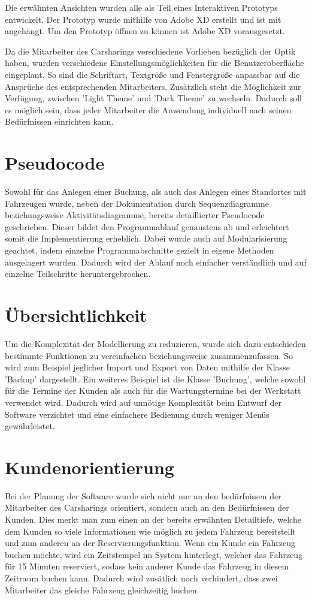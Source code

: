 Die erwähnten Ansichten wurden alle als Teil eines Interaktiven Prototyps entwickelt. Der Prototyp wurde mithilfe von Adobe XD erstellt und ist mit angehängt. Um den Prototyp öffnen zu können ist Adobe XD vorausgesetzt.

Da die Mitarbeiter des Carsharings verschiedene Vorlieben bezüglich der Optik haben, wurden verschiedene Einstellungsmöglichkeiten für die Benutzeroberfläche eingeplant. So sind die Schriftart, Textgröße und Fenstergröße anpassbar auf die Ansprüche des entsprechenden Mitarbeiters. Zusätzlich steht die Möglichkeit zur Verfügung, zwischen 'Light Theme' und 'Dark Theme' zu wechseln. Dadurch soll es möglich sein, dass jeder Mitarbeiter die Anwendung individuell nach seinen Bedürfnissen einrichten kann.

\section{Pseudocode}
Sowohl für das Anlegen einer Buchung, als auch das Anlegen eines Standortes mit Fahrzeugen wurde, neben der Dokumentation durch Sequenzdiagramme beziehungsweise Aktivitätsdiagramme, bereits detaillierter Pseudocode geschrieben. Dieser bildet den Programmablauf genaustens ab und erleichtert somit die Implementierung erheblich. Dabei wurde auch auf Modularisierung geachtet, indem einzelne Programmabschnitte gezielt in eigene Methoden ausgelagert wurden. Dadurch wird der Ablauf noch einfacher verständlich und auf einzelne Teilschritte heruntergebrochen.

\section{Übersichtlichkeit}
Um die Komplexität der Modellierung zu reduzieren, wurde sich dazu entschieden bestimmte Funktionen zu vereinfachen beziehungsweise zusammenzufassen. So wird zum Beispiel jeglicher Import und Export von Daten mithilfe der Klasse 'Backup' dargestellt. Ein weiteres Beispiel ist die Klasse 'Buchung', welche sowohl für die Termine der Kunden als auch für die Wartungstermine bei der Werkstatt verwendet wird. Dadurch wird auf unnötige Komplexität beim Entwurf der Software verzichtet und eine einfachere Bedienung durch weniger Menüs gewährleistet.

\section{Kundenorientierung}
Bei der Planung der Software wurde sich nicht nur an den bedürfnissen der Mitarbeiter des Carsharings orientiert, sondern auch an den Bedürfnissen der Kunden. Dies merkt man zum einen an der bereits erwähnten Detailtiefe, welche dem Kunden so viele Informationen wie möglich zu jedem Fahrzeug bereitstellt und zum anderen an der Reservierungsfunktion. Wenn ein Kunde ein Fahrzeug buchen möchte, wird ein Zeitstempel im System hinterlegt, welcher das Fahrzeug für 15 Minuten reserviert, sodass kein anderer Kunde das Fahrzeug in diesem Zeitraum buchen kann. Dadurch wird zusätlich noch verhindert, dass zwei Mitarbeiter das gleiche Fahrzeug gleichzeitig buchen.  
